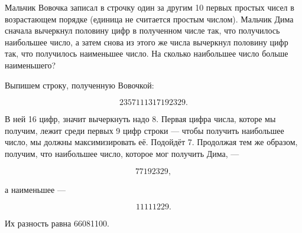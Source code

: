 
\begin{itemize}

\itC Мальчик Вовочка записал в строчку один за другим 10 первых простых чисел в возрастающем порядке (единица не считается простым числом). Мальчик Дима сначала вычеркнул половину цифр в полученном числе так, что получилось наибольшее число, а затем снова из этого же числа вычеркнул половину цифр так, что получилось наименьшее число. На сколько наибольшее число больше наименьшего?

\itr Выпишем строку, полученную Вовочкой:

\vspace{-0.4cm}
$$2357111317192329.$$

В ней 16 цифр, значит вычеркнуть надо 8. Первая цифра числа, которе мы получим, лежит среди первых 9 цифр строки — чтобы получить наибольшее число, мы должны максимизировать её. Подойдёт 7. Продолжая тем же образом, получим, что наибольшее число, которое мог получить Дима, —

\vspace{-0.4cm}
$$77192329,$$

а наименьшее —

\vspace{-0.4cm}
$$11111229.$$

Их разность равна 66081100.

\end{itemize}



